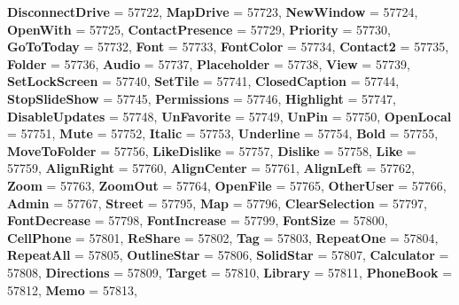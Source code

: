 \begin{DoxyCompactItemize}
{\bfseries Disconnect\+Drive} = 57722, 
{\bfseries Map\+Drive} = 57723, 
{\bfseries New\+Window} = 57724, 
\newline
{\bfseries Open\+With} = 57725, 
{\bfseries Contact\+Presence} = 57729, 
{\bfseries Priority} = 57730, 
{\bfseries Go\+To\+Today} = 57732, 
\newline
{\bfseries Font} = 57733, 
{\bfseries Font\+Color} = 57734, 
{\bfseries Contact2} = 57735, 
{\bfseries Folder} = 57736, 
\newline
{\bfseries Audio} = 57737, 
{\bfseries Placeholder} = 57738, 
{\bfseries View} = 57739, 
{\bfseries Set\+Lock\+Screen} = 57740, 
\newline
{\bfseries Set\+Tile} = 57741, 
{\bfseries Closed\+Caption} = 57744, 
{\bfseries Stop\+Slide\+Show} = 57745, 
{\bfseries Permissions} = 57746, 
\newline
{\bfseries Highlight} = 57747, 
{\bfseries Disable\+Updates} = 57748, 
{\bfseries Un\+Favorite} = 57749, 
{\bfseries Un\+Pin} = 57750, 
\newline
{\bfseries Open\+Local} = 57751, 
{\bfseries Mute} = 57752, 
{\bfseries Italic} = 57753, 
{\bfseries Underline} = 57754, 
\newline
{\bfseries Bold} = 57755, 
{\bfseries Move\+To\+Folder} = 57756, 
{\bfseries Like\+Dislike} = 57757, 
{\bfseries Dislike} = 57758, 
\newline
{\bfseries Like} = 57759, 
{\bfseries Align\+Right} = 57760, 
{\bfseries Align\+Center} = 57761, 
{\bfseries Align\+Left} = 57762, 
\newline
{\bfseries Zoom} = 57763, 
{\bfseries Zoom\+Out} = 57764, 
{\bfseries Open\+File} = 57765, 
{\bfseries Other\+User} = 57766, 
\newline
{\bfseries Admin} = 57767, 
{\bfseries Street} = 57795, 
{\bfseries Map} = 57796, 
{\bfseries Clear\+Selection} = 57797, 
\newline
{\bfseries Font\+Decrease} = 57798, 
{\bfseries Font\+Increase} = 57799, 
{\bfseries Font\+Size} = 57800, 
{\bfseries Cell\+Phone} = 57801, 
\newline
{\bfseries Re\+Share} = 57802, 
{\bfseries Tag} = 57803, 
{\bfseries Repeat\+One} = 57804, 
{\bfseries Repeat\+All} = 57805, 
\newline
{\bfseries Outline\+Star} = 57806, 
{\bfseries Solid\+Star} = 57807, 
{\bfseries Calculator} = 57808, 
{\bfseries Directions} = 57809, 
\newline
{\bfseries Target} = 57810, 
{\bfseries Library} = 57811, 
{\bfseries Phone\+Book} = 57812, 
{\bfseries Memo} = 57813, 

\end{DoxyCompactItemize}
